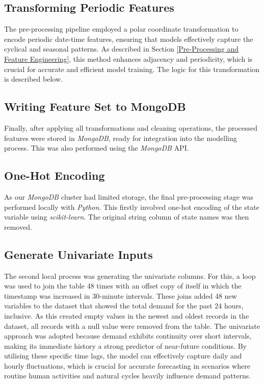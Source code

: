 \documentclass[mstat,12pt]{unswthesis}
\begin{document}
\hypertarget{transform-periodic}{%
\subsection{Transforming Periodic Features}\label{transform-periodic}}
The pre-processing pipeline employed a polar coordinate transformation to encode periodic date-time features, ensuring that models effectively capture the cyclical and seasonal patterns. As described in Section \ref{Pre-Processing and Feature Engineering}, this method enhances adjacency and periodicity, which is crucial for accurate and efficient model training. The logic for this transformation is described below.

\hypertarget{write-features}{%
\subsection{Writing Feature Set to \textnormal{MongoDB}}\label{write-features}}
Finally, after applying all transformations and cleaning operations, the processed features were stored in \textit{MongoDB}, ready for integration into the modelling process. This was also performed using the \textit{MongoDB} API.

\hypertarget{ohe}{%
\subsection{One-Hot Encoding}\label{ohe}}

As our \textit{MongoDB} cluster had limited storage, the final pre-processing stage was performed locally with \textit{Python}. This firstly involved one-hot encoding of the state variable using \textit{scikit-learn}. The original string column of state names was then removed.

\hypertarget{univariate-gen}{%
\subsection{Generate Univariate Inputs}\label{univariate-gen}}

The second local process was generating the univariate columns. For this, a loop was used to join the table 48 times with an offset copy of itself in which the timestamp was increased in 30-minute intervals. These joins added 48 new variables to the dataset that showed the total demand for the past 24 hours, inclusive. As this created empty values in the newest and oldest records in the dataset, all records with a null value were removed from the table. The univariate approach was adopted because demand exhibits continuity over short intervals, making its immediate history a strong predictor of near-future conditions. By utilising these specific time lags, the model can effectively capture daily and hourly fluctuations, which is crucial for accurate forecasting in scenarios where routine human activities and natural cycles heavily influence demand patterns.
\end{document}
